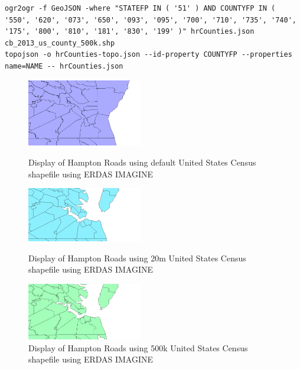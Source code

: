 \documentclass[10pt,journal,compsoc]{IEEEtran}
\begin{document}
	\begin{minipage}[t]{0.85\linewidth}
	\begin{lstlisting}[caption={Command for converting shapefile into GeoJSON format}, label={lst:convert-shapefile-commands}]
ogr2ogr -f GeoJSON -where "STATEFP IN ( '51' ) AND COUNTYFP IN ( '550', '620', '073', '650', '093', '095', '700', '710', '735', '740', '175', '800', '810', '181', '830', '199' )" hrCounties.json cb_2013_us_county_500k.shp
topojson -o hrCounties-topo.json --id-property COUNTYFP --properties name=NAME -- hrCounties.json
	\end{lstlisting}
	\end{minipage}

\begin{figure}[htbp]

	\centering
	\includegraphics[width=0.45\textwidth]{images/hr-with-2014-tl-shapefile.png}
	\caption{Display of Hampton Roads using default United States Census shapefile using ERDAS IMAGINE}
	\label{fig:hr-tl-shapefile-view}
	
	\vspace{3em}
	
	\includegraphics[width=0.45\textwidth]{images/hr-with-2013-cb-20m-shapefile.png}
	\caption{Display of Hampton Roads using 20m United States Census shapefile using ERDAS IMAGINE}
	\label{fig:hr-cb-20m-shapefile-view}

	\vspace{3em}

	\centering
	\includegraphics[width=0.45\textwidth]{images/hr-with-2013-cb-500k-shapefile.png}
	\caption{Display of Hampton Roads using 500k United States Census shapefile using ERDAS IMAGINE}
	\label{fig:hr-cb-500k-shapefile-view}	
\end{figure}
\end{document}
